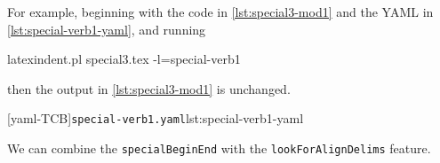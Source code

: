  \begin{example}
 For example, beginning with the code in \cref{lst:special3-mod1} and the YAML in
 \cref{lst:special-verb1-yaml}, and running 

 \begin{commandshell}
latexindent.pl special3.tex -l=special-verb1
\end{commandshell}

 then the output in \cref{lst:special3-mod1} is unchanged.

 \begin{cmhtcbraster}
  [yaml-TCB]{\texttt{special-verb1.yaml}}{lst:special-verb1-yaml}
 \end{cmhtcbraster}
 \end{example}

 We can combine the \texttt{specialBeginEnd} with the \texttt{lookForAlignDelims} feature.

